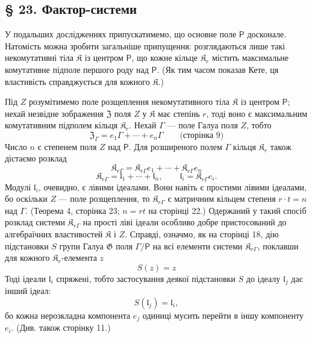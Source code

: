 \documentclass[11pt]{article}
\begin{document}
\subsection*{§ 23. Фактор-системи}\label{faktorensysteme}

У подальших дослідженнях припускатимемо, що основне поле \(\mathsf P\) досконале. Натомість можна зробити загальніше припущення: розглядаються лише такі некомутативні тіла \(\mathfrak K\) із центром \(\mathsf P\), що кожне кільце \(\mathfrak K_r\) містить максимальне комутативне підполе першого роду над \(\mathsf P\). (Як тим часом показав Кете, ця властивість справджується для кожного \(\mathfrak K\).)

Під \(Z\) розумітимемо поле розщеплення некомутативного тіла \(\mathfrak K\) із центром \(\mathsf P\); нехай незвідне зображення \(\mathfrak Z\) поля \(Z\) у \(\mathfrak K\) має степінь \(r\), тоді воно є максимальним комутативним підполем кільця \(\mathfrak K_r\). Нехай \(\Gamma\) --- поле Галуа поля \(Z\), тобто
\[
\mathfrak Z_\Gamma=e_1\Gamma+\cdots+e_n\Gamma
\qquad\text{(сторінка 9)}
\]
Число \(n\) є степенем поля \(Z\) над \(\mathsf P\). Для розширеного полем \(\Gamma\) кільця \(\mathfrak K_r\) також дістаємо розклад
\[
\mathfrak K_{r\Gamma}=\mathfrak K_{r\Gamma}e_1+\cdots+\mathfrak K_{r\Gamma}e_n
\]
\[
\mathfrak K_{r\Gamma}=\mathfrak l_1+\cdots+\mathfrak l_n,\qquad
\mathfrak l_i=\mathfrak K_{r\Gamma}e_i.
\]
Модулі \(\mathfrak l_i\), очевидно, є лівими ідеалами. Вони навіть є простими лівими ідеалами, бо оскільки \(Z\) --- поле розщеплення, то \(\mathfrak K_{r\Gamma}\) є матричним кільцем степеня \(r\cdot t=n\) над \(\Gamma\). (Теорема 4, сторінка 23; \(n=rt\) на сторінці 22.) Одержаний у такий спосіб розклад системи \(\mathfrak K_{r\Gamma}\) на прості ліві ідеали особливо добре пристосований до алгебраїчних властивостей \(\mathfrak K\) і \(Z\). Справді, означмо, як на сторінці 18, дію підстановки \(S\) групи Галуа \(\mathfrak G\) поля \(\Gamma/\mathsf P\) на всі елементи системи \(\mathfrak K_{r\Gamma}\), поклавши для кожного \(\mathfrak K_r\)-елемента \(z\)
\[
S(z)=z
\]
Тоді ідеали \(\mathfrak l_i\) спряжені, тобто застосування деякої підстановки \(S\) до ідеалу \(\mathfrak l_j\) дає інший ідеал:
\[
S(\mathfrak l_j)=\mathfrak l_i,
\]
бо кожна нерозкладна компонента \(e_j\) одиниці мусить перейти в іншу компоненту \(e_i\). (Див. також сторінку 11.)
\end{document}
